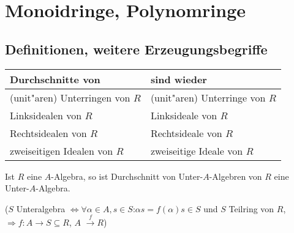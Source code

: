 \section{Monoidringe, Polynomringe}
\subsection{Definitionen, weitere Erzeugungsbegriffe}
  \begin{tabular}{l|l}
  Durchschnitte von & sind wieder\\
  \hline
  (unit"aren) Unterringen von $R$ & (unit"aren) Unterringe von $R$\\
  Linksidealen von $R$ & Linksideale von $R$\\ 
  Rechtsidealen von $R$ & Rechtsideale von $R$\\
  zweiseitigen Idealen von $R$ & zweiseitige Ideale von $R$\\
  \end{tabular}
  
  Ist $R$ eine $A$-Algebra, so ist Durchschnitt von Unter-$A$-Algebren von 
  $R$ eine Unter-$A$-Algebra.
  
  ($S$ Unteralgebra $\iff \forall \alpha \in A, s\in S$:$\alpha s=f(\alpha)s\in S$
  und $S$ Teilring von $R$, $\Rightarrow f:A\longrightarrow S \subseteq R$,
  $A$ $\stackrel{f}{\longrightarrow} R$)
  
